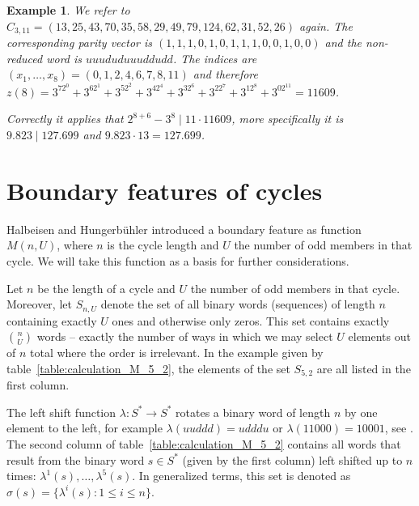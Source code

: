 \documentclass[12pt]{amsart}
\newtheorem{example}[theorem]{Example}
\theoremstyle{definition}
\begin{document}
\begin{example}
We refer to $C_{3,11}=(13,25,43,70,35,58,29,49,79,124,62,31,52,26)$ again. The corresponding parity vector is $(1,1,1,0,1,0,1,1,1,0,0,1,0,0)$ and the non-reduced word is $uuududuuuddudd$. The indices are $(x_1,\ldots,x_8)=(0,1,2,4,6,7,8,11)$ and therefore $z(8)=3^72^0+3^62^1+3^52^2+3^42^4+3^32^6+3^22^7+3^12^8+3^02^{11}=11609$.

\par\medskip\noindent
Correctly it applies that $2^{8+6}-3^8\mid11\cdot11609$, more specifically it is $9.823\mid127.699$ and $9.823\cdot13=127.699$. 
\end{example}


\section{Boundary features of cycles}
Halbeisen and Hungerbühler \cite{Ref_Halbeisen_Hungerbuehler_1997} introduced a boundary feature as function $M(n,U)$, where $n$ is the cycle length and $U$ the number of odd members in that cycle. We will take this function as a basis for further considerations.

Let $n$ be the length of a cycle and $U$ the number of odd members in that cycle. Moreover, let $S_{n,U}$ denote the set of all binary words (sequences) of length $n$ containing exactly $U$ ones and otherwise only zeros. This set contains exactly $\binom{n}{U}$ words -- exactly the number of ways in which we may select $U$ elements out of $n$ total where the order is irrelevant. In the example given by table~\ref{table:calculation_M_5_2}, the elements of the set $S_{5,2}$ are all listed in the first column.

The left shift function $\lambda:S^\ast\rightarrow S^\ast$ rotates a binary word of length $n$ by one element to the left, for example $\lambda(uuddd)=udddu$ or $\lambda(11000)=10001$, see \cite{Ref_Halbeisen_Hungerbuehler_1997}. The second column of table~\ref{table:calculation_M_5_2} contains all words that result from the binary word $s\in S^\ast$ (given by the first column) left shifted up to $n$ times: $\lambda^1(s),\ldots,\lambda^5(s)$. In generalized terms, this set is denoted as $\sigma(s)=\{\lambda^i(s):1\le i\le n\}$.
\end{document}

